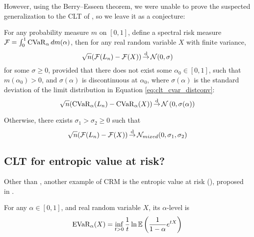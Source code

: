 However, using the Berry--Esseen theorem, we were unable to prove the suspected generalization to the CLT of \cvar, so we leave it as a conjecture:
\begin{conj}\label{conj:clt_spec}
	For any probability measure $m$ on $[0, 1]$, define a spectral risk measure $\mathcal{F} = \int_0^1 \operatorname{CVaR}_\alpha dm(\alpha)$, then for any real random variable $X$ with finite variance, 
	\begin{equation}
	\sqrt{n}(\mathcal{F}(L_n) - \mathcal{F}(X)) \operatorname*{\stackrel{\text {d}}{\to}} \mathcal{N}(0, \sigma)
	\end{equation}
	for some $\sigma \ge 0$, provided that there does not exist some $\alpha_0\in[0, 1]$, such that $m(\alpha_0) > 0$, and $\sigma(\alpha)$ is discontinuous at $\alpha_0$, where $\sigma(\alpha)$ is the standard deviation of the limit distribution in Equation \ref{eq:clt_cvar_distconv}:
	$$\sqrt{n}(\operatorname{CVaR}_\alpha(L_n) - \operatorname{CVaR}_\alpha(X)) \operatorname*{\stackrel{\text {d}}{\to}} \mathcal{N}\left(0, \sigma(\alpha)\right)$$
	
	Otherwise, there exists $\sigma_1 > \sigma_2 \ge 0$ such that 
	\begin{equation}
	\sqrt{n}(\mathcal{F}(L_n) - \mathcal{F}(X)) \operatorname*{\stackrel{\text {d}}{\to}} \mathcal{N}_{mixed}(0, \sigma_1, \sigma_2)
	\end{equation}
\end{conj}

\subsection{CLT for entropic value at risk?}

Other than \cvar, another example of CRM is the entropic value at risk (\evar), proposed in \cite{ahmadi-javidEntropicValueatriskNew2012}.

\begin{defn}
	\label{defn:evar}
	For any $\alpha \in [0, 1]$, and real random variable $X$, its $\alpha$-level \evar is
	\begin{equation}
	\label{eq:evar_def}
	\operatorname{EVaR}_\alpha (X) = \inf_{t>0} \frac 1 t \ln\mathbb{E}\left(\frac{1}{1-\alpha}e^{tX}\right)
	\end{equation}
\end{defn}


